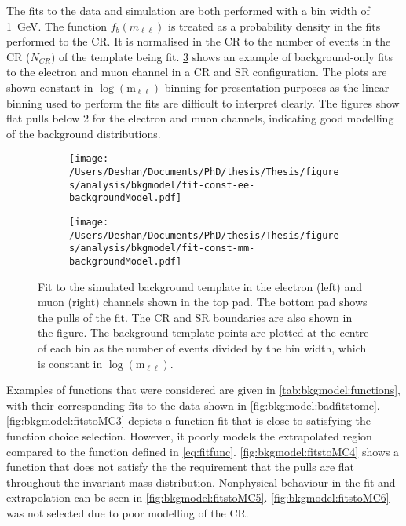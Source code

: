 The fits to the data and simulation are both performed with a bin width of \SI{1}{\giga\electronvolt}. The function $f_b(m_{\ell\ell})$ is treated as a probability density in the fits performed to the CR. It is normalised in the CR to the number of events in the CR ($N_{CR}$) of the template being fit. \cref{fig:bkgmodel:fitstoMC} shows an example of background-only fits to the electron and muon channel in a CR and SR configuration. The plots are shown constant in $\log{(\text{m}_{\ell\ell})}$ binning for presentation purposes as the linear binning used to perform the fits are difficult to interpret clearly. The figures show flat pulls below 2 for the electron and muon channels, indicating good modelling of the background distributions. 

\begin{figure}[h!]
    \centering
    \begin{subfigure}[b]{0.49\textwidth}
        \centering
        \texttt{[image: /Users/Deshan/Documents/PhD/thesis/Thesis/figures/analysis/bkgmodel/fit-const-ee-backgroundModel.pdf]}
        \label{fig:fitstoMC1}
    \end{subfigure}
    \begin{subfigure}[b]{0.49\textwidth}
        \centering
        \texttt{[image: /Users/Deshan/Documents/PhD/thesis/Thesis/figures/analysis/bkgmodel/fit-const-mm-backgroundModel.pdf]}
        \label{fig:fitstoMC2}
    \end{subfigure}
    \caption[Fits to the simulated background template in the electron and muon channels]{Fit to the simulated background template in the electron (left) and muon (right) channels shown in the top pad. The bottom pad shows the pulls of the fit. The CR and SR boundaries are also shown in the figure. The background template points are plotted at the centre of each bin as the number of events divided by the bin width, which is constant in $\log{(\text{m}_{\ell\ell})}$.}
    \label{fig:bkgmodel:fitstoMC}
\end{figure}

Examples of functions that were considered are given in \cref{tab:bkgmodel:functions}, with their corresponding fits to the data shown in \cref{fig:bkgmodel:badfitstomc}. \cref{fig:bkgmodel:fitstoMC3} depicts a function fit that is close to satisfying the function choice selection. However, it poorly models the extrapolated region compared to the function defined in \cref{eq:fitfunc}. \cref{fig:bkgmodel:fitstoMC4} shows a function that does not satisfy the the requirement that the pulls are flat throughout the invariant mass distribution. Nonphysical behaviour in the fit and  extrapolation can be seen in \cref{fig:bkgmodel:fitstoMC5}. \cref{fig:bkgmodel:fitstoMC6} was not selected due to poor modelling of the CR. 

